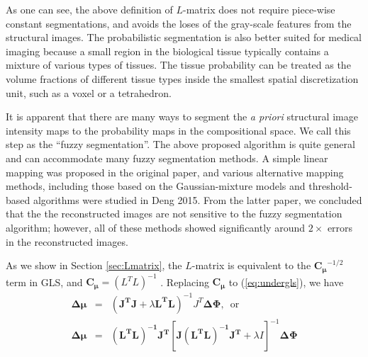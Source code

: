 \documentclass[12pt]{book}               %
\begin{document}
As one can see, the above definition of $L$-matrix does not require piece-wise constant segmentations, and avoids the loses of the gray-scale features from the structural images. The probabilistic segmentation is also better suited for medical imaging because a small region in the biological tissue typically contains a mixture of various types of tissues. The tissue probability can be treated as the volume fractions of different tissue types inside the smallest spatial discretization unit, such as a voxel or a tetrahedron.

It is apparent that there are many ways to segment the \emph{a priori} structural image intensity maps to the probability maps in the compositional space. We call this step as the ``fuzzy segmentation''. The above proposed algorithm is quite general and can accommodate many fuzzy segmentation methods. A simple linear mapping was proposed in the original paper, and various alternative mapping methods, including those based on the Gaussian-mixture models and threshold-based algorithms were studied in Deng 2015. From the latter paper, we concluded that the the reconstructed images are not sensitive to the fuzzy segmentation algorithm; however, all of these methods showed significantly around $2\times$ errors in the reconstructed images.

As we show in Section \ref{sec:Lmatrix}, the $L$-matrix is equivalent to the $\mathbf{C_\mu}^{-1/2}$ term in GLS, and $\mathbf{C_\mu}=(L^TL)^{-1}$ . Replacing $\mathbf{C_\mu}$ to (\ref{eq:undergls}), we have
\begin{eqnarray}
\mathbf{\Delta\mu}&=& (\mathbf{J^TJ}+\lambda \mathbf{L^TL})^{-1}J^T\mathbf{\Delta\Phi},\,\textrm{ or}\\
\mathbf{\Delta\mu}&=&\mathbf{(L^TL)^{-1} J^T}\left[\mathbf{J(L^TL)^{-1}J^T}+\lambda I\right]^{-1}\mathbf{\Delta\Phi}
\end{eqnarray}
\end{document}
